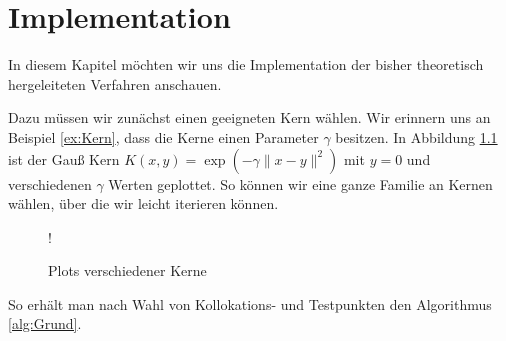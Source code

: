 \chapter{Implementation}
\label{cha:Implementation}

In diesem Kapitel möchten wir uns die Implementation der bisher theoretisch hergeleiteten Verfahren anschauen.

Dazu müssen wir zunächst einen geeigneten Kern wählen. Wir erinnern uns an Beispiel \ref{ex:Kern}, dass die Kerne einen Parameter $\gamma$ besitzen. In Abbildung \ref{fig:Kerne} ist der Gauß Kern $K(x,y) = \exp\left(-\gamma \|x-y\|^2\right)$ mit $y= 0$ und verschiedenen $\gamma$ Werten geplottet. So können wir eine ganze Familie an Kernen wählen, über die wir leicht iterieren können.
\begin{figure}[h]
\centering
\resizebox {.65\columnwidth} {!} {

}
\caption{Plots verschiedener Kerne}
\label{fig:Kerne}
\end{figure}

So erhält man nach Wahl von Kollokations- und Testpunkten den Algorithmus \ref{alg:Grund}.


